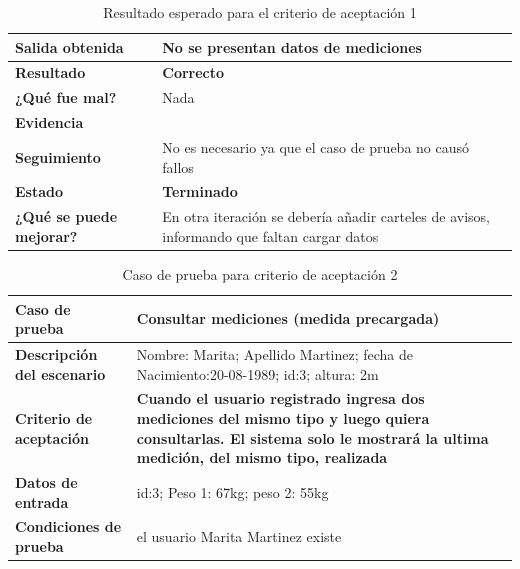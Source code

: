         {\scriptsize
	\begin{table}[h]
	\centering
	\begin{tabular}{|l|p{10cm}|}
	    \hline 
	    \textbf{Salida obtenida}& No se presentan datos de mediciones\\ \hline
	    \textbf{Resultado}& \textbf{Correcto}\\ \hline
        \textbf{¿Qué fue mal?}& Nada\\ \hline      
        \textbf{Evidencia}& \\ \hline
        \textbf{Seguimiento}&No es necesario ya que el caso de prueba no causó
fallos \\ \hline
        \textbf{Estado}& \textbf{Terminado}\\ \hline        
         \textbf{¿Qué se puede mejorar?}& En otra iteración se debería añadir carteles de avisos, informando que faltan cargar datos \\ \hline              
	    \end{tabular}
        \caption{Resultado esperado para el criterio de aceptación 1}
    	\end{table}
	}
\clearpage 

{\scriptsize
	\begin{table}[h]
	\centering
	\begin{tabular}{||l|p{9cm}||}
    	\rowcolor[gray]{0.9}
	    \hline 
        \hline 
	    \textbf{Caso de prueba}  &  \textbf{Consultar mediciones (medida precargada)}\\  \hline
	    \textbf{Descripción del escenario}& Nombre: Marita; Apellido Martinez; fecha de Nacimiento:20-08-1989; id:3; altura: 2m  \\ 			\hline
	    \textbf{Criterio de aceptación} &\textbf{ Cuando el usuario registrado ingresa dos mediciones del mismo tipo y luego quiera consultarlas. El sistema solo le mostrará la ultima medición, del mismo tipo, realizada} \\ \hline
        \textbf{Datos de entrada}& id:3; Peso 1: 67kg; peso 2: 55kg \\ \hline
        \textbf{Condiciones de  prueba}& el usuario Marita Martinez existe \\ \hline 			\hline
	    \end{tabular}
        \caption{Caso de prueba para criterio de aceptación 2}        
	    \end{table}
}
 
